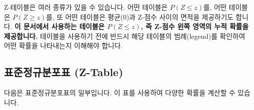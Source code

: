 \documentclass[11pt,a4paper]{article}
\theoremstyle{definition}
\begin{document}
\begin{warningbox}[title=\textbf{Z-테이블 사용 시 주의사항}]
Z-테이블은 여러 종류가 있을 수 있습니다. 어떤 테이블은 $P(Z \le z)$를, 어떤 테이블은 $P(Z \ge z)$를, 또 어떤 테이블은 평균(0)과 Z-점수 사이의 면적을 제공하기도 합니다. \textbf{이 문서에서 사용하는 테이블은 $P(Z \le z)$, 즉 Z-점수 왼쪽 영역의 누적 확률을 제공합니다.} 테이블을 사용하기 전에 반드시 해당 테이블의 범례(legend)를 확인하여 어떤 확률을 나타내는지 이해해야 합니다.
\end{warningbox}

\subsection{표준정규분포표 (Z-Table)}
다음은 표준정규분포표의 일부입니다. 이 표를 사용하여 다양한 확률을 계산할 수 있습니다.
\end{document}
